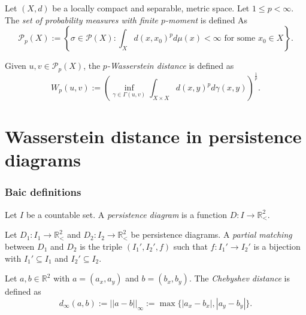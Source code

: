 \documentclass[aspectratio=169]{beamer}
\newcommand{\p}{\mathcal P}
\newcommand{\R}{\mathbb R}
\newcommand{\upr}{\mathbb{R}_<^2}
\begin{document}
  \begin{frame}
    \begin{definition}
      Let $ (X, d) $ be a locally compact and separable, metric space. Let $ 1 \leq p < \infty $. The {\it set of probability measures with finite $p$-moment} is defined As
      $$
          \p_p (X) := \left\{ \sigma \in \p (X) : \int_X d(x, x_0)^p d \mu (x) < \infty \text{ for some } x_0 \in X \right\}.
      $$
  \end{definition}
    \begin{definition}
      Given $ u, v \in \p_p (X) $, the {\it $p$-Wasserstein distance} is defined as
      $$
          W_p(u, v) := \left( \inf_{\gamma \in \Gamma(u, v)} \int_{X \times X} d(x,y)^p d\gamma(x, y)\right)^{\frac{1}{p}}.
      $$
  \end{definition}
  \end{frame}

\section{Wasserstein distance in persistence diagrams}

\begin{frame}
  \frametitle{Baic definitions}
  \begin{definition}
    Let $ I $ be a countable set. A {\it persistence diagram} is a function $ D: I \to \upr $.
  \end{definition}

  \begin{definition}
    Let $ D_1: I_1 \to \upr $ and $ D_2: I_2 \to \upr $ be persistence diagrams. A {\it partial matching} between $ D_1 $ and $ D_2 $ is the triple $ (I_1', I_2', f) $ such that $ f: I_1' \to I_2' $ is a bijection with $ I_1' \subseteq I_1 $ and $ I_2' \subseteq I_2 $.
  \end{definition}
  \begin{definition}
    Let $ a, b \in \R^2 $ with $a = (a_x, a_y) $ and $ b = (b_x, b_y) $. The {\it Chebyshev distance} is defined as
    $$
        d_\infty(a, b) := ||a-b||_{\infty} := \max \{|a_x - b_x|, |a_y - b_y|\}.
    $$
  \end{definition}
\end{frame}
\end{document}
